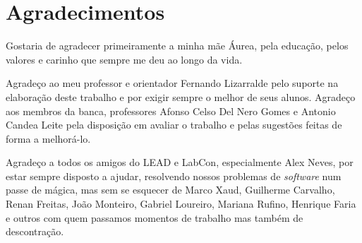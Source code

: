 \chapter*{Agradecimentos}

Gostaria de agradecer primeiramente a minha mãe Áurea, pela educação, pelos valores e carinho que sempre me deu ao longo da vida.

Agradeço ao meu professor e orientador Fernando Lizarralde pelo suporte na elaboração deste trabalho e por exigir sempre o melhor de seus alunos. Agradeço aos membros da banca, professores Afonso Celso Del Nero Gomes e Antonio Candea Leite pela disposição em avaliar o trabalho e pelas sugestões feitas de forma a melhorá-lo.

Agradeço a todos os amigos do LEAD e LabCon, especialmente Alex Neves, por estar sempre disposto a ajudar, resolvendo nossos problemas de \textit{software} num passe de mágica, mas sem se esquecer de Marco Xaud, Guilherme Carvalho, Renan Freitas, João Monteiro, Gabriel Loureiro, Mariana Rufino, Henrique Faria e outros com quem passamos momentos de trabalho mas também de descontração.